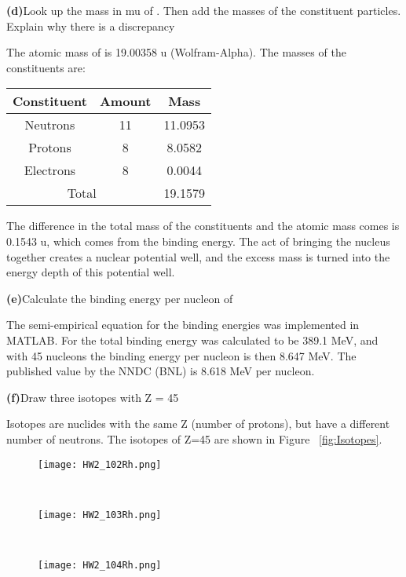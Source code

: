 \documentclass[11pt]{article}
\renewcommand{\part}[1] {\vspace{.10in} {\bf (#1)}}
\begin{document}
\part{d}{Look up the mass in mu of . Then add the masses of the constituent particles. Explain why there is a discrepancy}

The atomic mass of  is 19.00358 u (Wolfram-Alpha).
The masses of the constituents are:
\begin{center}
	\begin{tabular}{c c c}
	Constituent & Amount & Mass \\
	\hline
	\hline
	Neutrons & 11 & 11.0953 \\
	Protons & 8 & 8.0582 \\
	Electrons & 8 & 0.0044 \\ 
	\multicolumn{2}{c}{Total} & 19.1579
\end{tabular}
\end{center}
The difference in the total mass of the constituents and the atomic mass comes is 0.1543 u, which comes from the binding energy.
The act of bringing the nucleus together creates a nuclear potential well, and the excess mass is turned into the energy depth of this potential well.

\part{e}{Calculate the binding energy per nucleon of }

The semi-empirical equation for the binding energies was implemented in MATLAB. For  the total binding energy was calculated to be 389.1 MeV, and with 45 nucleons the binding energy per nucleon is then 8.647 MeV. The published value by the NNDC (BNL) is 8.618 MeV per nucleon.

\part{f}{Draw three isotopes with Z = 45}

Isotopes are nuclides with the same Z (number of protons), but have a different number of neutrons.
The isotopes of Z=45 are shown in Figure ~\ref{fig:Isotopes}.
\begin{figure*}[!ht]
	\centering
	\begin{subfigure}[b]{0.3\textwidth}
		\centering
		\texttt{[image: HW2\_102Rh.png]}
	\end{subfigure}%
	~
	\begin{subfigure}[b]{0.3\textwidth}
		\centering
		\texttt{[image: HW2\_103Rh.png]}
	\end{subfigure}%
	~
	\begin{subfigure}[b]{0.3\textwidth}
		\centering
		\texttt{[image: HW2\_104Rh.png]}
	\end{subfigure}
	\caption{Isotopes of Z = 45}
	\label{fig:Isotopes}
\end{figure*}
\end{document}
